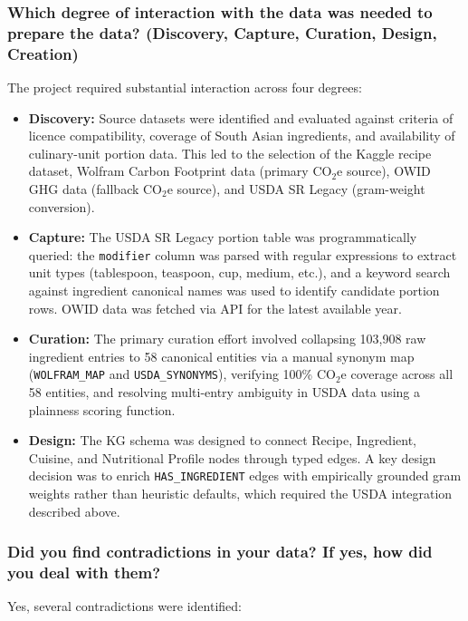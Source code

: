 \documentclass{article}
\newcommand{\question}[1]{#1}
\begin{document}
\question{\subsubsection*{Which degree of interaction with the data was needed to prepare the data? (Discovery, Capture, Curation, Design, Creation)}}

The project required substantial interaction across four degrees:

\begin{itemize}
    \item \textbf{Discovery:} Source datasets were identified and evaluated against criteria of licence compatibility, coverage of South Asian ingredients, and availability of culinary-unit portion data. This led to the selection of the Kaggle recipe dataset, Wolfram Carbon Footprint data (primary CO$_2$e source), OWID GHG data (fallback CO$_2$e source), and USDA SR Legacy (gram-weight conversion).
    \item \textbf{Capture:} The USDA SR Legacy portion table was programmatically queried: the \texttt{modifier} column was parsed with regular expressions to extract unit types (tablespoon, teaspoon, cup, medium, etc.), and a keyword search against ingredient canonical names was used to identify candidate portion rows. OWID data was fetched via API for the latest available year.
    \item \textbf{Curation:} The primary curation effort involved collapsing 103,908 raw ingredient entries to 58 canonical entities via a manual synonym map (\texttt{WOLFRAM\_MAP} and \texttt{USDA\_SYNONYMS}), verifying 100\% CO$_2$e coverage across all 58 entities, and resolving multi-entry ambiguity in USDA data using a plainness scoring function.
    \item \textbf{Design:} The KG schema was designed to connect Recipe, Ingredient, Cuisine, and Nutritional Profile nodes through typed edges. A key design decision was to enrich \texttt{HAS\_INGREDIENT} edges with empirically grounded gram weights rather than heuristic defaults, which required the USDA integration described above.
\end{itemize}

\question{\subsubsection*{Did you find contradictions in your data? If yes, how did you deal with them?}}

Yes, several contradictions were identified:
\end{document}
